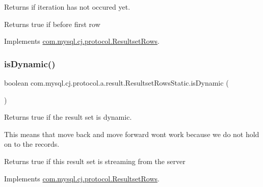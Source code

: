 Returns if iteration has not occured yet.

\begin{DoxyReturn}{Returns}
true if before first row 
\end{DoxyReturn}


Implements \mbox{\hyperlink{interfacecom_1_1mysql_1_1cj_1_1protocol_1_1_resultset_rows_a748205e182d8b1b1263ebe78c7062517}{com.\+mysql.\+cj.\+protocol.\+Resultset\+Rows}}.

\mbox{\label{classcom_1_1mysql_1_1cj_1_1protocol_1_1a_1_1result_1_1_resultset_rows_static_acf9221e596a879c793000246688ff8f6}} 
\subsubsection{\texorpdfstring{is\+Dynamic()}{isDynamic()}}
{\footnotesize\ttfamily boolean com.\+mysql.\+cj.\+protocol.\+a.\+result.\+Resultset\+Rows\+Static.\+is\+Dynamic (\begin{DoxyParamCaption}{ }\end{DoxyParamCaption})}

Returns true if the result set is dynamic.

This means that move back and move forward won\textquotesingle{}t work because we do not hold on to the records.

\begin{DoxyReturn}{Returns}
true if this result set is streaming from the server 
\end{DoxyReturn}


Implements \mbox{\hyperlink{interfacecom_1_1mysql_1_1cj_1_1protocol_1_1_resultset_rows_aa9dd39e935202eca58365a9f0c166db8}{com.\+mysql.\+cj.\+protocol.\+Resultset\+Rows}}.

\mbox{\label{classcom_1_1mysql_1_1cj_1_1protocol_1_1a_1_1result_1_1_resultset_rows_static_a6e253f009ce83647195f60954d021cff}} 
